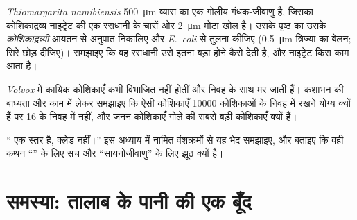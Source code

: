 \begin{exercise}[$\star\star\star$]\label{exo:b2:unicellular-diversity:10}
\emph{Thiomargarita namibiensis} \qty{500}{\micro m} व्यास का एक गोलीय
गंधक-जीवाणु है, जिसका कोशिकाद्रव्य नाइट्रेट की एक रसधानी के चारों ओर
\qty{2}{\micro m} मोटा खोल है। उसके पृष्ठ का उसके \emph{कोशिकाद्रव्यी}
आयतन से अनुपात निकालिए और \emph{E.~coli} से तुलना कीजिए
(\qty{0.5}{\micro m} त्रिज्या का बेलन; सिरे छोड़ दीजिए)। समझाइए कि वह
रसधानी उसे इतना बड़ा होने कैसे देती है, और नाइट्रेट किस काम आता है।
\end{exercise}

\begin{exercise}[$\star\star\star$]\label{exo:b2:unicellular-diversity:11}
\emph{Volvox} में कायिक कोशिकाएँ कभी विभाजित नहीं होतीं और निवह के साथ
मर जाती हैं। कशाभन की बाध्यता और  काम में लेकर समझाइए कि
ऐसी कोशिकाएँ \num{10000} कोशिकाओं के निवह में रखने योग्य क्यों हैं पर
16 के निवह में नहीं, और जनन कोशिकाएँ गोले की सबसे बड़ी कोशिकाएँ क्यों
हैं।
\end{exercise}

\begin{exercise}[$\star\star\star$]\label{exo:b2:unicellular-diversity:12}
`` एक स्तर है, क्लेड नहीं।'' इस अध्याय में नामित वंशक्रमों से
यह भेद समझाइए, और बताइए कि वही कथन ``'' के लिए सच और
``सायनोजीवाणु'' के लिए झूठ क्यों है।
\end{exercise}

\section{समस्या: तालाब के पानी की एक बूँद}

